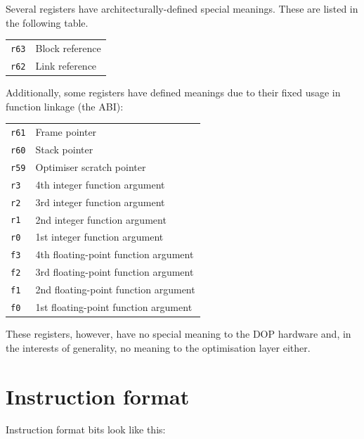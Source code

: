 Several registers have architecturally-defined special meanings. These are listed in the following table.

\begin{tabular}{ll}
\texttt{r63} & Block reference \\
\texttt{r62} & Link reference
\end{tabular}

Additionally, some registers have defined meanings due to their fixed usage in function linkage (the ABI):

\begin{tabular}{ll}
\texttt{r61} & Frame pointer \\
\texttt{r60} & Stack pointer \\
\texttt{r59} & Optimiser scratch pointer \\
\texttt{r3} & 4th integer function argument \\
\texttt{r2} & 3rd integer function argument \\
\texttt{r1} & 2nd integer function argument \\
\texttt{r0} & 1st integer function argument \\
\texttt{f3} & 4th floating-point function argument \\
\texttt{f2} & 3rd floating-point function argument \\
\texttt{f1} & 2nd floating-point function argument \\
\texttt{f0} & 1st floating-point function argument
\end{tabular}

These registers, however, have no special meaning to the DOP hardware and, in the interests of generality, no meaning to the optimisation layer either.

\section{Instruction format}

Instruction format bits look like this:

\vspace{0.3cm}
{\par}

{\centering {} \par}
\vspace{0.3cm}


